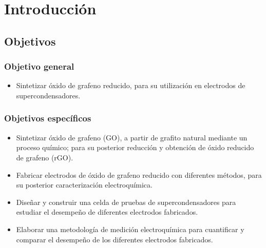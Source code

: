 \chapter{Introducción}
\section{Objetivos}
\subsection{Objetivo general}
\begin{itemize}
	\item Sintetizar óxido de grafeno reducido, para su utilización en electrodos de supercondensadores.
\end{itemize}
\subsection{Objetivos específicos}
\begin{itemize}
	\item Sintetizar óxido de grafeno (GO), a partir de grafito natural mediante un proceso químico; para su posterior reducción y obtención de óxido reducido de grafeno (rGO).
	\item Fabricar electrodos de óxido de grafeno reducido con diferentes métodos, para su posterior caracterización electroquímica.
	\item Diseñar y construir una celda de pruebas de supercondensadores para estudiar el desempeño de diferentes electrodos fabricados.
	\item Elaborar una metodología de medición electroquímica para cuantificar y comparar el desempeño de los diferentes electrodos fabricados. 
\end{itemize}
